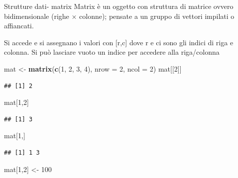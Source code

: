 \documentclass[
  ignorenonframetext,
]{beamer}
\newenvironment{Shaded}{\begin{snugshade}}{\end{snugshade}}
\newcommand{\AttributeTok}[1]{\textcolor[rgb]{0.13,0.29,0.53}{#1}}
\newcommand{\DecValTok}[1]{\textcolor[rgb]{0.00,0.00,0.81}{#1}}
\newcommand{\FunctionTok}[1]{\textcolor[rgb]{0.13,0.29,0.53}{\textbf{#1}}}
\newcommand{\NormalTok}[1]{#1}
\newcommand{\OtherTok}[1]{\textcolor[rgb]{0.56,0.35,0.01}{#1}}
\begin{document}
\begin{frame}[fragile]{Strutture dati- matrix}
\protect\hypertarget{strutture-dati--matrix}{}
Matrix è un oggetto con struttura di matrice ovvero bidimensionale
(righe × colonne); pensate a un gruppo di vettori impilati o affiancati.

Si accede e si assegnano i valori con {[}r,c{]} dove r e ci sono gli
indici di riga e colonna. Si può lasciare vuoto un indice per accedere
alla riga/colonna

\begin{Shaded}
\begin{Highlighting}[]
\NormalTok{mat }\OtherTok{\textless{}{-}} \FunctionTok{matrix}\NormalTok{(}\FunctionTok{c}\NormalTok{(}\DecValTok{1}\NormalTok{, }\DecValTok{2}\NormalTok{, }\DecValTok{3}\NormalTok{, }\DecValTok{4}\NormalTok{), }\AttributeTok{nrow =} \DecValTok{2}\NormalTok{, }\AttributeTok{ncol =} \DecValTok{2}\NormalTok{)}
\NormalTok{mat[[}\DecValTok{2}\NormalTok{]]}
\end{Highlighting}
\end{Shaded}

\begin{verbatim}
## [1] 2
\end{verbatim}

\begin{Shaded}
\begin{Highlighting}[]
\NormalTok{mat[}\DecValTok{1}\NormalTok{,}\DecValTok{2}\NormalTok{]}
\end{Highlighting}
\end{Shaded}

\begin{verbatim}
## [1] 3
\end{verbatim}

\begin{Shaded}
\begin{Highlighting}[]
\NormalTok{mat[}\DecValTok{1}\NormalTok{,]}
\end{Highlighting}
\end{Shaded}

\begin{verbatim}
## [1] 1 3
\end{verbatim}

\begin{Shaded}
\begin{Highlighting}[]
\NormalTok{mat[}\DecValTok{1}\NormalTok{,}\DecValTok{2}\NormalTok{] }\OtherTok{\textless{}{-}} \DecValTok{100}
\end{Highlighting}
\end{Shaded}
\end{frame}
\end{document}
